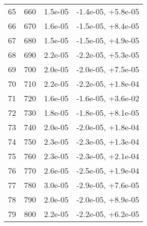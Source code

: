 \begin{table}
\begin{adjustbox}{width=1\textwidth/2}
\begin{tabular}{|c|c|c|c|}
\cline{1-4}
65 & 660 & 1.5e-05 & -1.4e-05, +5.8e-05 \\
\cline{1-4}
66 & 670 & 1.6e-05 & -1.5e-05, +8.4e-05 \\
\cline{1-4}
67 & 680 & 1.5e-05 & -1.5e-05, +4.9e-05 \\
\cline{1-4}
68 & 690 & 2.2e-05 & -2.2e-05, +5.3e-05 \\
\cline{1-4}
69 & 700 & 2.0e-05 & -2.0e-05, +7.5e-05 \\
\cline{1-4}
70 & 710 & 2.2e-05 & -2.2e-05, +1.8e-04 \\
\cline{1-4}
71 & 720 & 1.6e-05 & -1.6e-05, +3.6e-02 \\
\cline{1-4}
72 & 730 & 1.8e-05 & -1.8e-05, +8.1e-05 \\
\cline{1-4}
73 & 740 & 2.0e-05 & -2.0e-05, +1.8e-04 \\
\cline{1-4}
74 & 750 & 2.3e-05 & -2.3e-05, +1.3e-04 \\
\cline{1-4}
75 & 760 & 2.3e-05 & -2.3e-05, +2.1e-04 \\
\cline{1-4}
76 & 770 & 2.6e-05 & -2.5e-05, +1.9e-04 \\
\cline{1-4}
77 & 780 & 3.0e-05 & -2.9e-05, +7.6e-05 \\
\cline{1-4}
78 & 790 & 2.0e-05 & -2.0e-05, +8.9e-05 \\
\cline{1-4}
79 & 800 & 2.2e-05 & -2.2e-05, +6.2e-05 \\
\cline{1-4}
\end{tabular}
\end{adjustbox}
\end{table}


